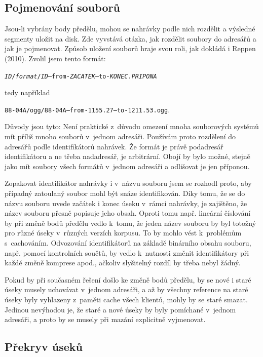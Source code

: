 \subsection{Pojmenování souborů}

Jsou-li vybrány body předělu, mohou se nahrávky podle nich rozdělit a výsledné
segmenty uložit na disk. Zde vyvstává otázka, jak rozdělit soubory do adresářů a
jak je pojmenovat. Způsob uložení souborů hraje svou roli, jak dokládá i
Reppen (2010)\cite{reppen2010building}. Zvolil jsem tento formát:

\texttt{{\em{}ID}/{\em{}format}/{\em{}ID}--from-{\em{}ZACATEK}--to-{\em{}KONEC}.{\em{}PRIPONA}}

tedy například

\texttt{88-04A/ogg/88-04A--from-1155.27--to-1211.53.ogg}.

Důvody jsou tyto: Není praktické z~důvodu omezení mnoha souborových systémů mít
příliš mnoho souborů v~jednom adresáři. Používám proto rozdělení do adresářů podle
identifikátorů nahrávek. Že formát je právě podadresář identifikátoru a ne třeba
nadadresář, je arbitrární. Obojí by bylo možné, stejně jako mít soubory všech formátů
v~jednom adresáři a odlišovat je jen příponou.

Zopakovat identifikátor nahrávky i v~názvu souboru jsem se rozhodl proto, aby
případný zatoulaný soubor mohl být snáze identifikován. Díky tomu, že se do
názvu souboru uvede začátek i konec úseku v~rámci nahrávky, je zajištěno, že název
souboru přesně popisuje jeho obsah. Oproti tomu např. lineární číslování by při
změně bodů předělu vedlo k~tomu, že jeden název souboru by byl totožný pro různé
úseky v~různých verzích korpusu. To by mohlo vést k~problémům s~cachováním.
Odvozování identifikátorů na základě binárního obsahu souboru, např. pomocí
kontrolních součtů, by vedlo k~nutnosti změnit identifikátory při každé
změně komprese apod., ačkoliv slyšitelný rozdíl by třeba nebyl žádný.

Pokud by při současném řešení došlo ke změně bodů předělu, by se nové i staré úseky musely
uchovávat v~jednom adresáři, a až by všechny reference na staré úseky byly
vyhlazeny z~paměti cache všech klientů, mohly by se staré smazat. Jedinou
nevýhodou je, že staré a nové úseky by byly pomíchané v~jednom adresáři, a proto
by se musely při mazání explicitně vyjmenovat.

\subsection{Překryv úseků}

